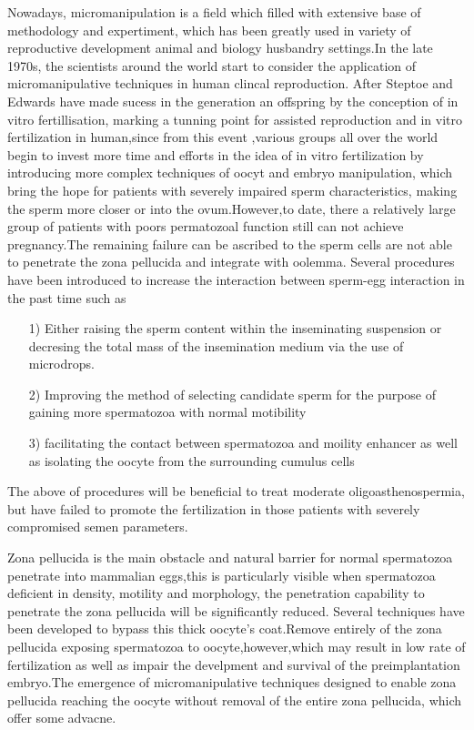 \documentclass[12pt]{article}
\begin{document}
Nowadays, micromanipulation is a field which filled with extensive base of methodology and expertiment, which has been greatly used in variety of reproductive development animal and biology husbandry settings.In the late 1970s, the scientists around the world start to consider the application of micromanipulative techniques in human clincal reproduction. After Steptoe and Edwards have made sucess in  
the  generation an offspring by the conception of in vitro fertillisation, marking a tunning point for assisted reproduction  and  in vitro fertilization in human,since from this event ,various groups all over the world begin to invest more time and efforts in the idea of in vitro fertilization by introducing more complex  techniques of oocyt and embryo manipulation, which bring the hope for patients with severely impaired sperm characteristics, making the sperm more closer or into the ovum.However,to date, there  a relatively large group of patients with poors permatozoal function still can not achieve pregnancy.The remaining failure can be ascribed to the sperm cells are not able to penetrate the zona pellucida and integrate with oolemma. Several procedures have been introduced to  increase the interaction between sperm-egg interaction in the past time such as 
\begin{itemize}
    \item [1)] 
    Either raising the sperm content within the inseminating suspension or decresing the total mass of the insemination medium via the use of microdrops.
    \item [2)] 
    Improving the method of selecting candidate sperm for the purpose of gaining more spermatozoa with normal motibility
    \item [3)]
    facilitating the contact between spermatozoa and moility enhancer as well as isolating the oocyte from the surrounding cumulus cells
\end{itemize}
The above of procedures will be beneficial to treat moderate oligoasthenospermia, but have failed to promote the fertilization in those patients with severely compromised semen parameters.\medskip

Zona pellucida is the main obstacle and natural barrier for normal spermatozoa penetrate into mammalian eggs,this is particularly visible when spermatozoa deficient in density, motility and morphology, the penetration capability to penetrate the zona pellucida will be significantly reduced.
Several techniques have been developed to bypass this thick oocyte's coat.Remove entirely of the zona pellucida exposing spermatozoa to oocyte,however,which may result in low rate of fertilization as well as impair the develpment and survival of the preimplantation embryo.The emergence of micromanipulative techniques designed to enable zona pellucida reaching the oocyte without removal of the entire zona pellucida, which offer some advacne.\medskip
\end{document}
